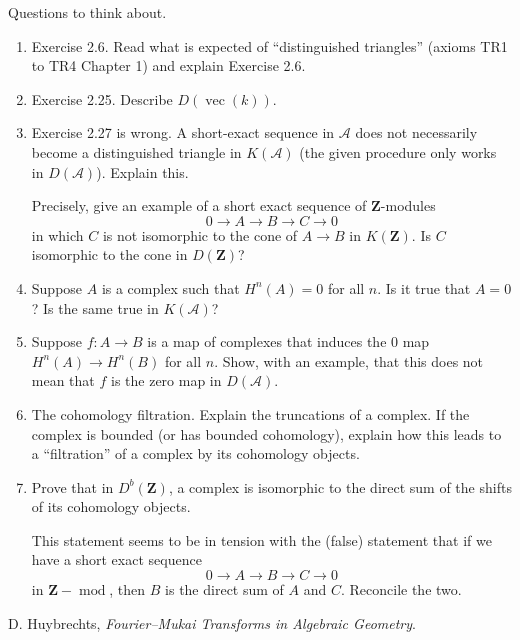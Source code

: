 \documentclass{amsart}
\begin{document}
Questions to think about.
\begin{enumerate}
\item Exercise 2.6. Read what is expected of ``distinguished triangles'' (axioms TR1 to TR4 Chapter 1) and explain Exercise 2.6.
\item Exercise 2.25.  Describe \(D(\operatorname{vec} (k))\).

\item Exercise 2.27 is wrong.  A short-exact sequence in \(\mathcal{A}\) does not necessarily become a distinguished triangle in \(K(\mathcal{A})\) (the given procedure only works in \(D(\mathcal{A})\)).  Explain this.

  Precisely, give an example of a short exact sequence of \(\mathbf{Z}\)-modules
  \[ 0 \to A \to B \to C \to 0\]
  in which \(C\) is not isomorphic to the cone of \(A \to B\) in \(K(\mathbf{Z})\).
  Is \(C\) isomorphic to the cone in \(D(\mathbf{Z})\)?

\item Suppose \(A\) is a complex such that \(H^n(A) = 0\) for all \(n\).
  Is it true that \(A = 0\)?
  Is the same true in \(K(\mathcal{A})\)?

\item Suppose \(f \colon A \to B\) is a  map of complexes that induces the \(0\) map \(H^n(A) \to H^n(B)\) for all \(n\).
  Show, with an example, that this does not mean that \(f\) is the zero map in \(D(\mathcal{A})\).

\item The cohomology filtration.
  Explain the truncations of a complex.
  If the complex is bounded (or has bounded cohomology), explain how this leads to a ``filtration'' of a complex by its cohomology objects.

\item Prove that in \(D^b(\mathbf{Z})\), a complex is isomorphic to the direct sum of the shifts of its cohomology objects.

  This statement seems to be in tension with the (false) statement that if we have a short exact sequence
\[ 0 \to A \to B \to C \to 0\]
in \(\mathbf{Z}-\operatorname{mod}\), then \(B\) is the direct sum of \(A\) and \(C\).
Reconcile the two.
  
\end{enumerate}



\begin{thebibliography}{1}
   D. Huybrechts, \emph{Fourier--Mukai Transforms in Algebraic Geometry}.
\end{thebibliography}
\end{document}
